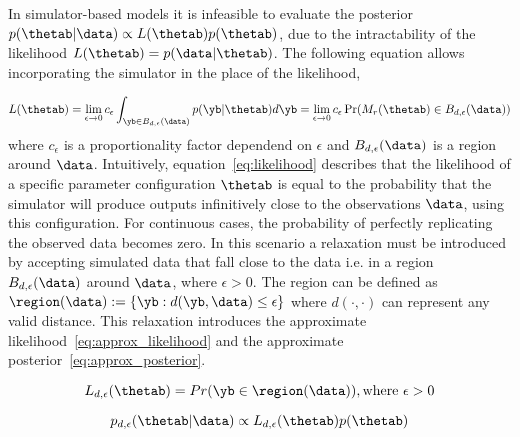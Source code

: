 In simulator-based models it is infeasible to evaluate the posterior
$p(\thetab|\data) \propto L(\thetab)p(\thetab)$, due to the
intractability of the likelihood $L(\thetab) = p(\data|\thetab)$. The
following equation allows incorporating the simulator in the place of
the likelihood,

\begin{equation} \label{eq:likelihood}
  L(\thetab) =
  \lim_{\epsilon \to 0} c_\epsilon \int_{\yb \in B_{d,\epsilon}(\data)} p(\yb|\thetab)d\yb =
  \lim_{\epsilon \to 0} c_\epsilon \Pr(M_r(\thetab) \in B_{d,\epsilon}(\data))
\end{equation}
%
where $c_\epsilon$ is a proportionality factor dependend on $\epsilon$
and $B_{d,\epsilon}(\data)$ is a region around $\data$. Intuitively,
equation~\ref{eq:likelihood} describes that the likelihood of a
specific parameter configuration $\thetab$ is equal to the probability
that the simulator will produce outputs infinitively close to the
observations $\data$, using this configuration. For continuous cases,
the probability of perfectly replicating the observed data becomes
zero. In this scenario a relaxation must be introduced by accepting
simulated data that fall close to the data i.e. in a region
$B_{d,\epsilon}(\data)$ around $\data$, where $\epsilon > 0$. The
region can be defined as
$\region (\data) := \{\yb: d(\yb, \data) \leq \epsilon \}$ where
$d(\cdot, \cdot)$ can represent any valid distance. This relaxation
introduces the approximate likelihood~\eqref{eq:approx_likelihood} and
the approximate posterior~\eqref{eq:approx_posterior}.

\begin{equation} \label{eq:approx_likelihood}
  L_{d, \epsilon}(\thetab) = Pr(\yb \in \region(\data)), \text{where  } \epsilon > 0
\end{equation}

\begin{equation} \label{eq:approx_posterior}
  p_{d,\epsilon}(\thetab|\data) \propto L_{d, \epsilon}(\thetab) p(\thetab)
\end{equation}
